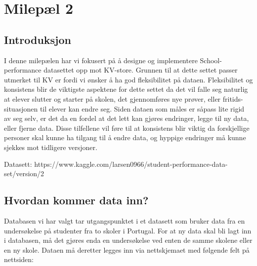 \section{Milepæl 2}
\subsection{Introduksjon}
I denne milepælen har vi fokusert på å designe og implementere School-performance datasettet opp mot KV-store. Grunnen til at dette settet passer utmerket til KV er fordi vi ønsker å ha god fleksibilitet på dataen. Fleksibilitet og konsistens blir de viktigste aspektene for dette settet da det vil falle seg naturlig at elever slutter og starter på skolen, det gjennomføres nye prøver, eller fritids-situasjonen til elever kan endre seg. Siden dataen som måles er såpass lite rigid av seg selv, er det da en fordel at det lett kan gjøres endringer, legge til ny data, eller fjerne data. Disse tilfellene vil føre til at konsistens blir viktig da forskjellige personer skal kunne ha tilgang til å endre data, og hyppige endringer må kunne sjekkes mot tidligere versjoner.

Datasett: https://www.kaggle.com/larsen0966/student-performance-data-set/version/2

\subsection{Hvordan kommer data inn?}
Databasen vi har valgt tar utgangspunktet i et datasett som bruker data fra en undersøkelse på studenter fra to skoler i Portugal. For at ny data skal bli lagt inn i databasen, må det gjøres enda en undersøkelse ved enten de samme skolene eller en ny skole. Dataen må deretter legges inn via nettskjemaet med følgende felt på nettsiden:

